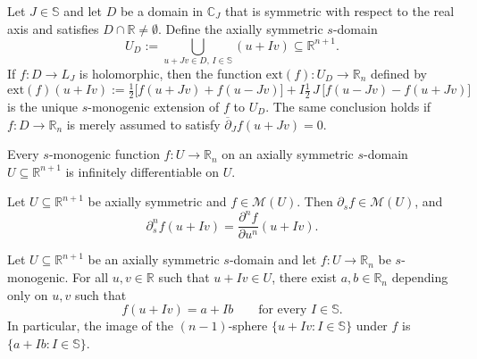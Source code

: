 \documentclass[11pt]{amsart}
\begin{document}
\begin{thm}\label{thm:extension}
Let $J \in \mathbb{S}$ and let $D$ be a domain in $\mathbb{C}_J$ that is symmetric with respect to the real axis and satisfies $D \cap \mathbb{R} \ne \emptyset$. Define the axially symmetric $s$-domain
\[
U_D := \bigcup_{u + Jv \in D,\, I \in \mathbb{S}} (u + Iv) \subseteq \mathbb{R}^{n+1}.
\]
If $f \colon D \to L_J$ is holomorphic, then the function $\mathrm{ext}(f) \colon U_D \to \mathbb{R}_n$ defined by
\begin{equation}\label{eq:extension-formula}
\mathrm{ext}(f)(u + Iv) := \tfrac{1}{2}\bigl[f(u + Jv) + f(u - Jv)\bigr] + I \tfrac{1}{2}\, J\, \bigl[f(u - Jv) - f(u + Jv)\bigr]
\end{equation}
is the unique $s$-monogenic extension of $f$ to $U_D$. The same conclusion holds if $f \colon D \to \mathbb{R}_n$ is merely assumed to satisfy $\overline\partial_J f(u + Jv) = 0$.
\end{thm}

\begin{thm}\label{thm:smoothness}
Every $s$-monogenic function $f \colon U \to \mathbb{R}_n$ on an axially symmetric $s$-domain $U \subseteq \mathbb{R}^{n+1}$ is infinitely differentiable on $U$.
\end{thm}

\begin{prop}\label{prop:s-derivative-monogenic}
Let $U \subseteq \mathbb{R}^{n+1}$ be axially symmetric and $f \in \mathcal M(U)$. Then $\partial_s f \in \mathcal M(U)$, and
\[
\partial_s^n f(u + Iv) = \frac{\partial^n f}{\partial u^n}(u + Iv).
\]
\end{prop}

\begin{cor}\label{cor:image-sphere}
Let $U \subseteq \mathbb{R}^{n+1}$ be an axially symmetric $s$-domain and let $f \colon U \to \mathbb{R}_n$ be $s$-monogenic. For all $u, v \in \mathbb{R}$ such that $u + Iv \in U$, there exist $a, b \in \mathbb{R}_n$ depending only on $u, v$ such that
\begin{equation}\label{eq:image-sphere}
f(u + Iv) = a + Ib \qquad \text{for every } I \in \mathbb{S}.
\end{equation}
In particular, the image of the $(n-1)$-sphere $\{u + Iv : I \in \mathbb{S}\}$ under $f$ is $\{a + Ib : I \in \mathbb{S}\}$.
\end{cor}
\end{document}
